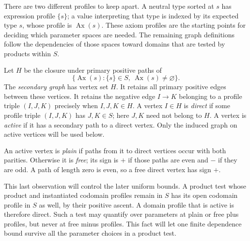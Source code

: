 There are two different profiles to keep apart.  A neutral type sorted
at $s$ has expression profile $\{s\}$; a value interpreting that type
is indexed by its expected type $s$, whose profile is
$\operatorname{Ax}(s)$.  These axiom profiles are the starting points
for deciding which parameter spaces are needed.  The remaining graph
definitions follow the dependencies of those spaces toward
domains that are tested by products within $S$.

Let $H$ be the closure under primary positive paths of
\[
 \{\operatorname{Ax}(s):\{s\}\in S,
                         \ \operatorname{Ax}(s)\ne\varnothing\}.
\]
The \emph{secondary graph} has vertex set $H$.  It retains all primary
positive edges between these vertices.  It retains the negative edge
$I\longrightarrow K$ belonging to a profile triple $(I,J,K)$ precisely
when $I,J,K\in H$.  A vertex $I\in H$ is \emph{direct} if some profile
triple $(I,J,K)$ has $J,K\in S$; here $J,K$ need not belong to $H$.
A vertex is \emph{active} if it has a secondary path to a direct vertex.
Only the induced graph on active vertices will be used below.

An active vertex is \emph{plain} if paths from it to direct vertices
occur with both parities.  Otherwise it is \emph{free}; its sign is $+$
if those paths are even and $-$ if they are odd.  A path of length zero
is even, so a free direct vertex has sign $+$.

This last observation will control the later uniform bounds.  A product
test whose product and instantiated codomain profiles remain in $S$
has its open codomain profile in $S$ as well, by their positive ascent.
A domain profile that is active is therefore direct.  Such a test may
quantify over parameters at plain or free plus profiles, but never at
free minus profiles.
This fact will let one finite dependence bound survive all the parameter
choices in a product test.

